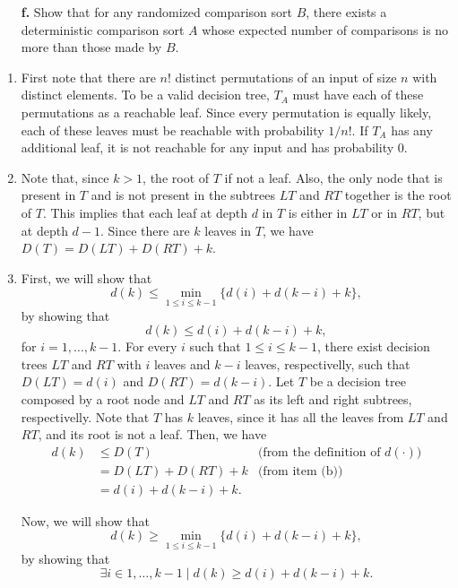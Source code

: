 \documentclass{report}
\makeatletter
\renewenvironment{framed}{%
 \def\FrameCommand##1{\hskip\@totalleftmargin
 \fboxsep=\FrameSep\fbox{##1}}%
 \MakeFramed {\advance\hsize-\width
   \@totalleftmargin\z@ \linewidth\hsize
   \@setminipage}}%
 {\par\unskip\endMakeFramed}
\DeclareMathOperator{\Exists}{\exists}
\makeatother
\begin{document}
\begin{enumerate}
{\begin{enumerate}
\item[\textbf{f.}]{Show that for any randomized comparison sort $B$, there
exists a deterministic comparison sort $A$ whose expected number of comparisons
is no more than those made by $B$.}
\end{enumerate}
}

\begin{framed}
\begin{enumerate}

\item{First note that there are $n!$ distinct permutations of an input of size
$n$ with distinct elements. To be a valid decision tree, $T_A$ must have each of
these permutations as a reachable leaf. Since every permutation is equally
likely, each of these leaves must be reachable with probability $1/n!$. If $T_A$
has any additional leaf, it is not reachable for any input and has probability
0.}

\item{Note that, since $k > 1$, the root of $T$ if not a leaf. Also, the only
node that is present in $T$ and is not present in the subtrees $LT$ and $RT$
together is the root of $T$. This implies that each leaf at depth $d$ in $T$ is
either in $LT$ or in $RT$, but at depth $d - 1$. Since there are $k$ leaves in
$T$, we have $D(T) = D(LT) + D(RT) + k$.}

\item{
First, we will show that
\[
  d(k) \le \min_{1 \le i \le k - 1} \{d(i) + d(k - i) + k\},
\]
by showing that
\[
  d(k) \le d(i) + d(k - i) + k,
\]
for $i = 1, \dots, k - 1$. For every $i$ such that $1 \le i \le k - 1$, there
exist decision trees $LT$ and $RT$ with $i$ leaves and $k - i$ leaves,
respectivelly, such that $D(LT) = d(i)$ and $D(RT) = d(k - i)$. Let $T$ be
a decision tree composed by a root node and $LT$ and $RT$ as its left and right
subtrees, respectivelly.  Note that $T$ has $k$ leaves, since it has all the
leaves from $LT$ and $RT$, and its root is not a leaf. Then, we have
\begin{equation*}
\begin{aligned}
  d(k) &\le D(T) & \text{(from the definition of $d(\cdot)$)}\\
       &=   D(LT) + D(RT) + k & \text{(from item (b))}\\
       &= d(i) + d(k - i) + k.
\end{aligned}
\end{equation*}

Now, we will show that
\[
  d(k) \ge \min_{1 \le i \le k - 1} \{d(i) + d(k - i) + k\},
\]
by showing that
\[
  \Exists i \in 1, \dots, k - 1 \; | \; d(k) \ge d(i) + d(k - i) + k.
\]

}
\end{enumerate}
\end{framed}
\end{enumerate}
\end{document}

